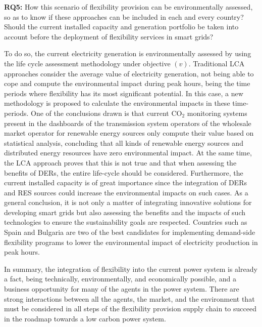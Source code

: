 \begin{tcolorbox}
\textbf{RQ5:} How this scenario of flexibility provision can be environmentally assessed, so as to know if these approaches can be included in each and every country? Should the current installed capacity and generation portfolio be taken into account before the deployment of flexibility services in smart grids?
\end{tcolorbox}

To do so, the current electricity generation is environmentally assessed by using the life cycle assessment methodology under objective $(v)$. Traditional LCA approaches consider the average value of electricity generation, not being able to cope and compute the environmental impact during peak hours, being the time periods where flexibility has its most significant potential. In this case, a new methodology is proposed to calculate the environmental impacts in these time-periods. One of the conclusions drawn is that current CO$_2$ monitoring systems present in the dashboards of the transmission system operators of the wholesale market operator for renewable energy sources only compute their value based on statistical analysis, concluding that all kinds of renewable energy sources and distributed energy resources have zero environmental impact. At the same time, the LCA approach proves that this is not true and that when assessing the benefits of DERs, the entire life-cycle should be considered. Furthermore, the current installed capacity is of great importance since the integration of DERs and RES sources could increase the environmental impacts on such cases. As a general conclusion, it is not only a matter of integrating innovative solutions for developing smart grids but also assessing the benefits and the impacts of such technologies to ensure the sustainability goals are respected. Countries such as Spain and Bulgaria are two of the best candidates for implementing demand-side flexibility programs to lower the environmental impact of electricity production in peak hours. 

In summary, the integration of flexibility into the current power system is already a fact, being technically, environmentally, and economically possible, and a business opportunity for many of the agents in the power system. There are strong interactions between all the agents, the market, and the environment that must be considered in all steps of the flexibility provision supply chain to succeed in the roadmap towards a low carbon power system. 
     
